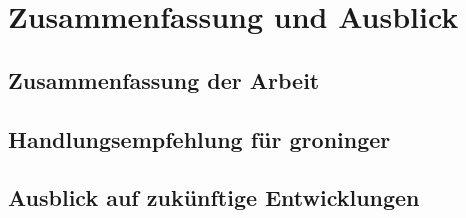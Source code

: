 \section{Zusammenfassung und Ausblick}
\subsection{Zusammenfassung der Arbeit}
\subsection{Handlungsempfehlung für groninger}
\subsection{Ausblick auf zukünftige Entwicklungen}